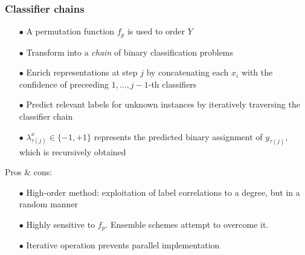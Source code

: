 \documentclass{beamer}
\begin{document}
\begin{frame}
\frametitle{Classifier chains}
\begin{itemize}
\item[$\bullet$] A permutation function $f_p$ is used to order $Y$
\item[$\bullet$] Transform into a \emph{chain} of binary classification problems
\item[$\bullet$] Enrich representations at step $j$ by concatenating each $x_i$ with the confidence of preceeding $1,\dots,j-1$-th classifiers
\item[$\bullet$] Predict relevant labels for unknown instances by iteratively traversing the classifier chain
\item[$\bullet$] $\lambda_{\tau(j)}^x \in \{-1,+1\}$ represents the predicted binary assignment
of $y_{\tau(j)}$, which is recursively obtained
\end{itemize}

Pros \& cons:
\begin{itemize}
\item[$\bullet$] High-order method: exploitation of label correlations to a degree, but in a random manner
\item[$\bullet$] Highly sensitive to $f_p$. Ensemble schemes attempt to overcome it.
\item[$\bullet$] Iterative operation prevents parallel implementation
\end{itemize}
\end{frame}
\end{document}
